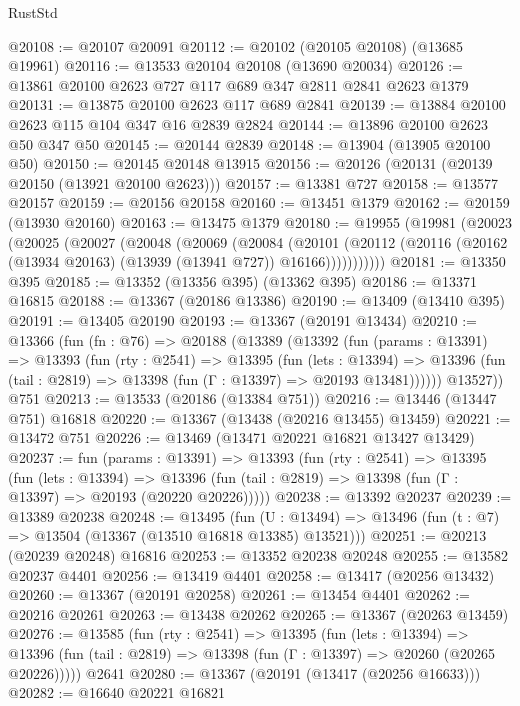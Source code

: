 \begin{lexlean}{RustStd}
\begin{coremodule}
@20108 := @20107 @20091
@20112 := @20102 (@20105 @20108) (@13685 @19961)
@20116 := @13533 @20104 @20108 (@13690 @20034)
@20126 := @13861 @20100 @2623 @727 @117 @689 @347 @2811 @2841 @2623 @1379
@20131 := @13875 @20100 @2623 @117 @689 @2841
@20139 := @13884 @20100 @2623 @115 @104 @347 @16 @2839 @2824
@20144 := @13896 @20100 @2623 @50 @347 @50
@20145 := @20144 @2839
@20148 := @13904 (@13905 @20100 @50)
@20150 := @20145 @20148 @13915
@20156 := @20126 (@20131 (@20139 @20150 (@13921 @20100 @2623)))
@20157 := @13381 @727
@20158 := @13577 @20157
@20159 := @20156 @20158
@20160 := @13451 @1379
@20162 := @20159 (@13930 @20160)
@20163 := @13475 @1379
@20180 := @19955
    (@19981
      (@20023
        (@20025
          (@20027
            (@20048
              (@20069
                (@20084
                  (@20101
                    (@20112 (@20116 (@20162 (@13934 @20163) (@13939 (@13941 @727)) @16166)))))))))))
@20181 := @13350 @395
@20185 := @13352 (@13356 @395) (@13362 @395)
@20186 := @13371 @16815
@20188 := @13367 (@20186 @13386)
@20190 := @13409 (@13410 @395)
@20191 := @13405 @20190
@20193 := @13367 (@20191 @13434)
@20210 := @13366
    (fun (fn : @76) =>
    @20188
      (@13389
        (@13392
          (fun (params : @13391) =>
          @13393
            (fun (rty : @2541) =>
            @13395
              (fun (lets : @13394) =>
              @13396 (fun (tail : @2819) => @13398 (fun (Γ : @13397) => @20193 @13481))))))
        @13527))
    @751
@20213 := @13533 (@20186 (@13384 @751))
@20216 := @13446 (@13447 @751) @16818
@20220 := @13367 (@13438 (@20216 @13455) @13459)
@20221 := @13472 @751
@20226 := @13469 (@13471 @20221 @16821 @13427 @13429)
@20237 := fun (params : @13391) =>
  @13393
    (fun (rty : @2541) =>
    @13395
      (fun (lets : @13394) =>
      @13396 (fun (tail : @2819) => @13398 (fun (Γ : @13397) => @20193 (@20220 @20226)))))
@20238 := @13392 @20237
@20239 := @13389 @20238
@20248 := @13495
    (fun (U : @13494) => @13496 (fun (t : @7) => @13504 (@13367 (@13510 @16818 @13385) @13521)))
@20251 := @20213 (@20239 @20248) @16816
@20253 := @13352 @20238 @20248
@20255 := @13582 @20237 @4401
@20256 := @13419 @4401
@20258 := @13417 (@20256 @13432)
@20260 := @13367 (@20191 @20258)
@20261 := @13454 @4401
@20262 := @20216 @20261
@20263 := @13438 @20262
@20265 := @13367 (@20263 @13459)
@20276 := @13585
    (fun (rty : @2541) =>
    @13395
      (fun (lets : @13394) =>
      @13396 (fun (tail : @2819) => @13398 (fun (Γ : @13397) => @20260 (@20265 @20226)))))
    @2641
@20280 := @13367 (@20191 (@13417 (@20256 @16633)))
@20282 := @16640 @20221 @16821

\end{coremodule}
\end{lexlean}
